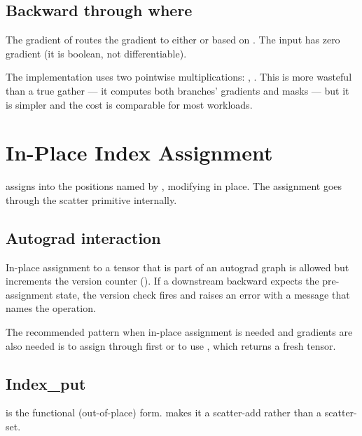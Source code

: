 \subsection{Backward through where}
\label{ssec:indexing:where_back}

The gradient of  routes the gradient to
either  or  based on . The
 input has zero gradient (it is boolean, not
differentiable).

The implementation uses two pointwise multiplications:
, . This is more wasteful than a true gather --- it
computes both branches' gradients and masks --- but it is simpler
and the cost is comparable for most workloads.

\section{In-Place Index Assignment}
\label{sec:indexing:put_inplace}

 assigns  into the positions
named by , modifying  in place. The assignment
goes through the scatter primitive internally.

\subsection{Autograd interaction}
\label{ssec:indexing:autograd_inplace}

In-place assignment to a tensor that is part of an autograd graph
is allowed but increments the version counter
(). If a downstream backward expects the
pre-assignment state, the version check fires and raises an
error with a message that names the operation.

The recommended pattern when in-place assignment is needed and
gradients are also needed is to assign through 
first or to use , which returns a
fresh tensor.

\subsection{Index\_put}
\label{ssec:indexing:index_put}

 is the
functional (out-of-place) form.  makes it a
scatter-add rather than a scatter-set.

